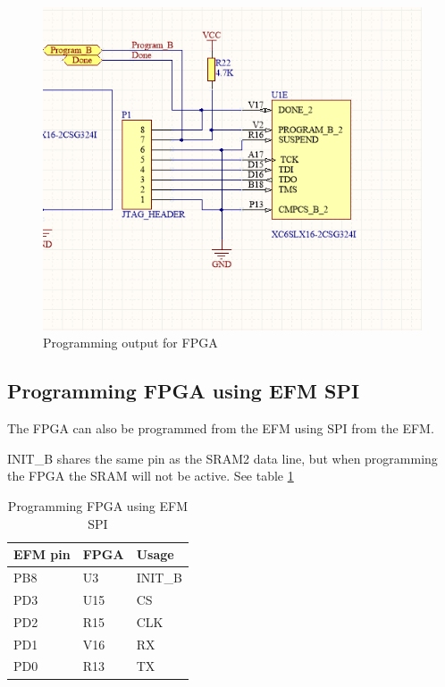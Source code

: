 \begin{figure}
    \includegraphics[width=\linewidth]{img/FPGA_Programmer}
    \caption{Programming output for FPGA}
    \label{fig:FpgaProgrammer}
\end{figure}

\subsection{Programming FPGA using EFM SPI}
The FPGA can also be programmed from the EFM using SPI from the EFM.

INIT\_B shares the same pin as the SRAM2 data line, but when programming the FPGA the SRAM will not be active.
See table \ref{tab:SpiProgrammer}

\begin{table}[]
    \centering
    \begin{tabular}{lll}
        EFM pin & FPGA & Usage   \\
        \hline
        PB8     & U3   & INIT\_B \\
        PD3     & U15  & CS      \\
        PD2     & R15  & CLK     \\
        PD1     & V16  & RX      \\
        PD0     & R13  & TX
    \end{tabular}
    \caption{Programming FPGA using EFM SPI}
    \label{tab:SpiProgrammer}
\end{table}


